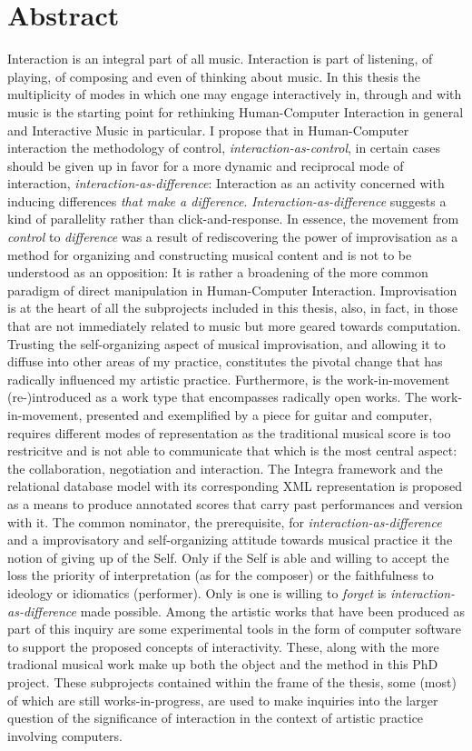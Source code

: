 \chapter*{Abstract}
\label{cha:abstract}


Interaction is an integral part of all music. Interaction is part of listening, of playing, of composing and even of thinking about music. In this thesis the multiplicity of modes in which one may engage interactively in, through and with music is the starting point for rethinking Human-Computer Interaction in general and Interactive Music in particular. I propose that in Human-Computer interaction the methodology of control, \emph{interaction-as-control}, in certain cases should be given up in favor for a more dynamic and reciprocal mode of interaction, \emph{interaction-as-difference}: Interaction as an activity concerned with inducing differences \emph{that make a difference}. \emph{Interaction-as-difference} suggests a kind of parallelity rather than click-and-response. In essence, the movement from \emph{control} to \emph{difference} was a result of rediscovering the power of improvisation as a method for organizing and constructing musical content and is not to be understood as an opposition: It is rather a broadening of the more common paradigm of direct manipulation in Human-Computer Interaction. Improvisation is at the heart of all the subprojects included in this thesis, also, in fact, in those that are not immediately related to music but more geared towards computation. Trusting the self-organizing aspect of musical improvisation, and allowing it to diffuse into other areas of my practice, constitutes the pivotal change that has radically influenced my artistic practice. Furthermore, is the work-in-movement (re-)introduced as a work type that encompasses radically open works. The work-in-movement, presented and exemplified by a piece for guitar and computer, requires different modes of representation as the traditional musical score is too restricitve and is not able to communicate that which is the most central aspect: the collaboration, negotiation and interaction. The Integra framework and the relational database model with its corresponding XML representation is proposed as a means to produce annotated scores that carry past performances and version with it. The common nominator, the prerequisite, for \emph{interaction-as-difference} and a improvisatory and self-organizing attitude towards musical practice it the notion of giving up of the Self. Only if the Self is able and willing to accept the loss the priority of interpretation (as for the composer) or the faithfulness to ideology or idiomatics (performer). Only is one is willing to \emph{forget} is \emph{interaction-as-difference} made possible. Among the artistic works that have been produced as part of this inquiry are some experimental tools in the form of computer software to support the proposed concepts of interactivity. These, along with the more tradional musical work make up both the object and the method in this PhD project. These subprojects contained within the frame of the thesis, some (most) of which are still works-in-progress, are used to make inquiries into the larger question of the significance of interaction in the context of artistic practice involving computers.

